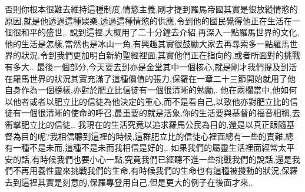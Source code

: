 \documentclass{book}
\begin{document}
否則你根本很難去維持這種制度,情慾主義,剛才提到羅馬帝國其實是很放縱情慾的原因,就是他透過這種娛樂,透過這種情慾的供應,令到他的國民覺得他正在生活在一個很和平的盛世,.
說到這裡,大概用了二十分鐘去介紹,再深入一點羅馬世界的文化,他的生活是怎樣,當然也是冰山一角,有興趣其實很鼓勵大家去再尋索多一點羅馬世界的狀況,令到我們更加明白新約聖經裡面,其實他們正在指向的,或者所面對的挑戰有多大..
最後一個部分,今天要去到亦是金堂其中一個核心,就是剛才我們提及到活在羅馬世界的狀況其實充滿了這種價值的張力,保羅在一章二十三節開始就用了他自身作為一個榜樣,亦對於肥立比信徒有一個很清晰的勉勵,.
他在兩欄當中,他如何以他者或者以肥立比的信徒為他決定的重心,而不是看自己,以致他亦對肥立比的信徒有一個很清晰的使命的呼召,最重要的就是活象,你的生活要與基督的福音相稱,去衝擊肥立比的信徒,.
我現在的生活究竟以追求羅馬公民為目的,還是以真正跟隨基督為目的呢?我相信聽到這裡的時候,這群肥立比的信徒心裡面總有一些的責難,總有一種不是未而,這種不是未而我相信是好的,.
如果我們的屬靈生活裡面經常太平安的話,有時候我們也要小心一點,究竟我們已經聽不進一些挑戰我們的說話,還是我們不再用養性靈來挑戰我們的生命,有時候我們的生命也有這種被攪動的狀況,保羅去到這裡其實是刻意的,保羅專登用自己,但是更大的例子在後面才來,.
\end{document}
